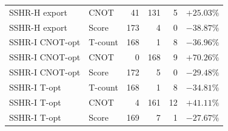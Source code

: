 \begin{tabular}{llrrrr}
SSHR-H export & CNOT & 41 & 131 & 5 & $+25.03\%$ \\
SSHR-H export & Score & 173 & 4 & 0 & $-38.87\%$ \\
SSHR-I CNOT-opt & T-count & 168 & 1 & 8 & $-36.96\%$ \\
SSHR-I CNOT-opt & CNOT & 0 & 168 & 9 & $+70.26\%$ \\
SSHR-I CNOT-opt & Score & 172 & 5 & 0 & $-29.48\%$ \\
SSHR-I T-opt & T-count & 168 & 1 & 8 & $-34.81\%$ \\
SSHR-I T-opt & CNOT & 4 & 161 & 12 & $+41.11\%$ \\
SSHR-I T-opt & Score & 169 & 7 & 1 & $-27.67\%$ \\
\bottomrule
\end{tabular}
